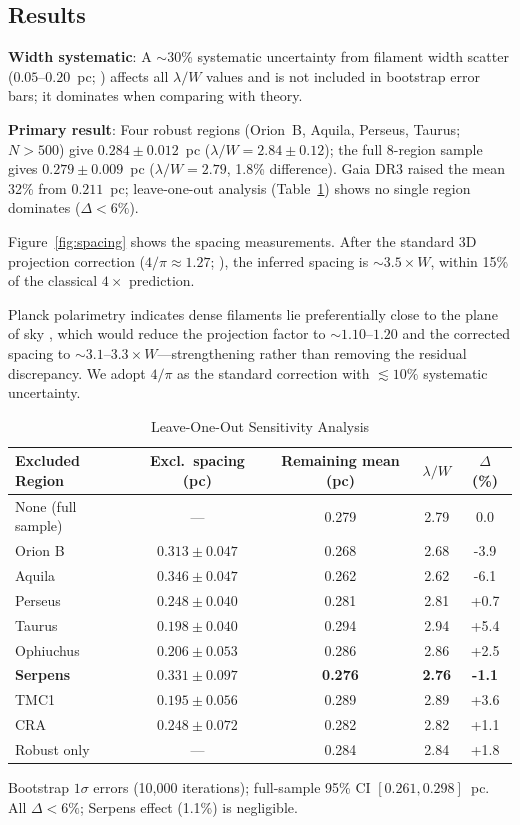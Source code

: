 \documentclass[twoside,twocolumn]{mnras}
\begin{document}
\subsection{Results}
\label{sec:results}

\textbf{Width systematic}: A $\sim$30\% systematic uncertainty from filament width
scatter ($0.05$--$0.20$~pc; \citealt{Panopoulou2022}) affects all $\lambda/W$ values
and is not included in bootstrap error bars; it dominates when comparing with theory.

\textbf{Primary result}: Four robust regions (Orion~B, Aquila, Perseus, Taurus;
$N > 500$) give $0.284 \pm 0.012$~pc ($\lambda/W = 2.84 \pm 0.12$); the full 8-region
sample gives $0.279 \pm 0.009$~pc ($\lambda/W = 2.79$, 1.8\% difference).
Gaia DR3 raised the mean 32\% from $0.211$~pc; leave-one-out analysis
(Table~\ref{tab:leave_one_out}) shows no single region dominates ($\Delta < 6\%$).

Figure~\ref{fig:spacing} shows the spacing measurements. After the standard 3D projection
correction ($4/\pi \approx 1.27$; \citealt{Andre2010}), the inferred spacing is
${\sim}3.5\times W$, within 15\% of the classical $4\times$ prediction.

Planck polarimetry indicates dense filaments lie preferentially close to the plane of
sky \citep{Planck2016}, which would reduce the projection factor to ${\sim}1.10$--$1.20$
and the corrected spacing to ${\sim}3.1$--$3.3\times W$---strengthening rather than
removing the residual discrepancy. We adopt $4/\pi$ as the standard correction
with $\lesssim10\%$ systematic uncertainty.

\begin{table}[h]
\caption{Leave-One-Out Sensitivity Analysis}
\label{tab:leave_one_out}
\begin{tabular}{lcccc}
\toprule
Excluded Region & Excl.\ spacing (pc) & Remaining mean (pc) & $\lambda/W$ & $\Delta$ (\%) \\
\midrule
None (full sample) & --- & 0.279 & 2.79 & 0.0 \\
Orion B & $0.313 \pm 0.047$ & 0.268 & 2.68 & -3.9 \\
Aquila & $0.346 \pm 0.047$ & 0.262 & 2.62 & -6.1 \\
Perseus & $0.248 \pm 0.040$ & 0.281 & 2.81 & +0.7 \\
Taurus & $0.198 \pm 0.040$ & 0.294 & 2.94 & +5.4 \\
Ophiuchus & $0.206 \pm 0.053$ & 0.286 & 2.86 & +2.5 \\
\textbf{Serpens} & $0.331 \pm 0.097$ & \textbf{0.276} & \textbf{2.76} & \textbf{-1.1} \\
TMC1 & $0.195 \pm 0.056$ & 0.289 & 2.89 & +3.6 \\
CRA & $0.248 \pm 0.072$ & 0.282 & 2.82 & +1.1 \\
\midrule
Robust only & --- & 0.284 & 2.84 & +1.8 \\
\bottomrule
\end{tabular}
\vspace{2pt}
\footnotesize Bootstrap $1\sigma$ errors (10,000 iterations); full-sample 95\% CI $[0.261, 0.298]$~pc. All $\Delta < 6\%$; Serpens effect (1.1\%) is negligible.
\end{table}
\end{document}
